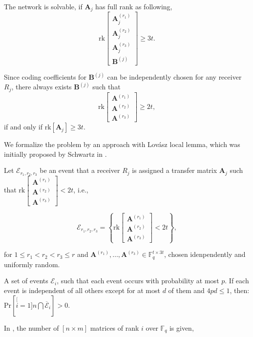 The network is solvable, if $\boldsymbol{A}_{j}$ has full rank as
following,
\[
\mathrm{rk}\left[\begin{array}{c}
\boldsymbol{A}_{j}^{\left(r_{1}\right)}\\
\boldsymbol{A}_{j}^{\left(r_{2}\right)}\\
\boldsymbol{A}_{j}^{\left(r_{3}\right)}\\
\boldsymbol{B}^{\left(j\right)}
\end{array}\right]\geq3t.
\]

Since coding coefficients for $\boldsymbol{B}^{\left(j\right)}$ can
be independently chosen for any receiver $R_{j}$, there always exists
$\boldsymbol{B}^{\left(j\right)}$ such that
\begin{equation}
\mathrm{rk}\left[\begin{array}{c}
\boldsymbol{A}^{\left(r_{1}\right)}\\
\boldsymbol{A}^{\left(r_{2}\right)}\\
\boldsymbol{A}^{\left(r_{3}\right)}
\end{array}\right]\geq2t,\label{eq:rk_rqm_e1l1h3s4}
\end{equation}
if and only if $\mathrm{rk}\left[\boldsymbol{A}_{j}\right]\geq3t$.

We formalize the problem by an approach with Lov\'asz local lemma,
which was initially proposed by Schwartz in \cite{MosheSchwartz:2018}.

Let $\mathcal{E}_{r_{1},r_{2},r_{3}}$ be an event that a receiver
$R_{j}$ is assigned a transfer matrix $\boldsymbol{A}_{j}$ such that
$\mathrm{rk}\left[\begin{array}{c}
\boldsymbol{A}^{\left(r_{1}\right)}\\
\boldsymbol{A}^{\left(r_{2}\right)}\\
\boldsymbol{A}^{\left(r_{3}\right)}
\end{array}\right]<2t$, i.e.,

\[
\mathcal{E}_{r_{1},r_{2},r_{3}}=\left\{ \mathrm{rk}\left[\begin{array}{c}
\boldsymbol{A}^{\left(r_{1}\right)}\\
\boldsymbol{A}^{\left(r_{2}\right)}\\
\boldsymbol{A}^{\left(r_{3}\right)}
\end{array}\right]<2t\right\} ,
\]

for $1\leq r_{1}<r_{2}<r_{3}\leq r$ and $\boldsymbol{A}^{\left(r_{1}\right)},\ldots,\boldsymbol{A}^{\left(r_{3}\right)}\in\ensuremath{\mathbb{F}}_{q}^{t\times3t}$,
chosen idenpendently and uniformly random.
\begin{lem}
 A set of events $\mathcal{E}_{i}$, such that each event occurs
with probability at most $p$. If each event is independent of all
others except for at most $d$ of them and $4pd\leq1$, then: $\mathrm{Pr}\left[\stackrel[i=1]{n}{\bigcap}\overline{\mathcal{E}}_{i}\right]>0$.
\label{thm:LLL}
\end{lem}
In \cite{Overbeck:2007}, the number of $\left[n\times m\right]$
matrices of rank $i$ over $\ensuremath{\mathbb{F}}_{q}$ is given,


